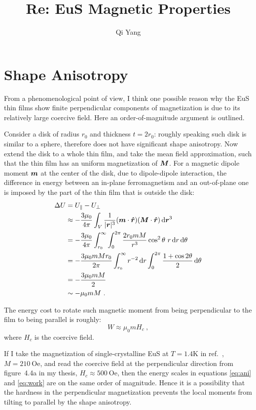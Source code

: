 \documentclass[11pt]{article}
\newcommand*\diff{\mathop{}\!\mathrm{d}}    %
\renewcommand{\vec}[1]{\vectorbold*{#1}} %
\renewcommand{\op}[1]{\vectorbold*{\hat#1}} %
\begin{document}
\title{Re: EuS Magnetic Properties}
\author{Qi Yang}
\maketitle
\section{Shape Anisotropy}
From a phenomenological point of view, I think one possible reason why the EuS thin films show finite perpendicular components of magnetization is due to its relatively large coercive field. Here an order-of-magnitude argument is outlined.

Consider a disk of radius $r_0$ and thickness $t=2r_0$: roughly speaking such disk is similar to a sphere, therefore does not have significant shape anisotropy. Now extend the disk to a whole thin film, and take the mean field approximation, such that the thin film has an uniform magnetization of $\vec{M}$. For a magnetic dipole moment $\vec{m}$ at the center of the disk, due to dipole-dipole interaction, the difference in energy between an in-plane ferromagnetism and an out-of-plane one is imposed by the part of the thin film that is outside the disk:
\begin{align}
    \Delta U &= U_\parallel - U_\perp\\
        &\approx -\frac{3\mu_0}{4\pi}\int_V\frac{1}{|\vec{r}|^3}(\vec{m}\cdot\op{r})(\vec{M}\cdot\op{r})\diff \vec{r}^3\\
        &= -\frac{3\mu_0}{4\pi}\int_{r_0}^\infty\int_0^{2\pi}\frac{2r_0mM}{r^3}\cos^2\theta~r\diff r\diff\theta\\
        &= -\frac{3\mu_0mMr_0}{2\pi}\int_{r_0}^\infty r^{-2}\diff r\int_0^{2\pi} \frac{1+\cos2\theta}{2}\diff\theta\\
        &= -\frac{3\mu_0mM}{2}\\
        &\sim -\mu_0mM\label{eq:ani}~.
\end{align}

The energy cost to rotate such magnetic moment from being perpendicular to the film to being parallel is roughly:
\begin{equation}
    W \approx \mu_0mH_c~,\label{eq:work}
\end{equation}
where $H_c$ is the coercive field.

If I take the magnetization of single-crystalline EuS at $T=1.4\mathrm{K}$ in ref.~\cite{EuS_Shafer}, $M = 210~\mathrm{Oe}$, and read the coercive field at the perpendicular direction from figure~4.4a in my thesis, $H_c \approx 500~\mathrm{Oe}$, then the energy scales in equations \ref{eq:ani} and \ref{eq:work} are on the same order of magnitude. Hence it is a possibility that the hardness in the perpendicular magnetization prevents the local moments from tilting to parallel by the shape anisotropy.

\printbibliography
\end{document}
